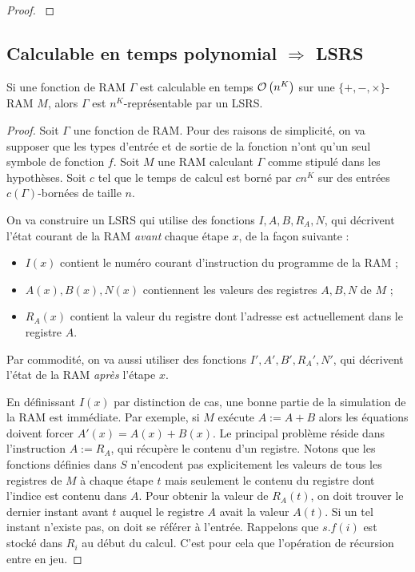 \begin{appendices}
\begin{proof}
{			}
			
		\end{proof}
		
		
		\subsection{Calculable en temps polynomial $\Rightarrow$ LSRS}
		\label{subsec:poly_implique_LSRS}
		
		\begin{conj}
			\label{conj:poly_implique_LSRS}
			Si une fonction de RAM $\Gamma$ est calculable en temps $\mathcal{O}\left( n^K  \right)$ sur une $\{+, -, \times \}$-RAM $M$, alors $\Gamma$ est $n^K$-représentable par un LSRS.
		\end{conj}
		
		\begin{proof}
			Soit $\Gamma$ une fonction de RAM. Pour des raisons de simplicité, on va supposer que les types d'entrée et de sortie de la fonction n'ont qu'un seul symbole de fonction $f$. Soit $M$ une RAM calculant $\Gamma$ comme stipulé dans les hypothèses. Soit $c$ tel que le temps de calcul est borné par $c n^K$ sur des entrées $c(\Gamma)$-bornées de taille $n$.
			
			On va construire un LSRS qui utilise des fonctions $I, A, B, R_A, N$, qui décrivent l'état courant de la RAM \emph{avant} chaque étape $x$, de la façon suivante :
			
			\begin{itemize}[itemsep=-1mm]
				\item	$I(x)$ contient le numéro courant d'instruction du programme de la RAM ;
				\item 	$A(x), B(x), N(x)$ contiennent les valeurs des registres $A, B, N$ de $M$ ;
				\item 	$R_A(x)$ contient la valeur du registre dont l'adresse est actuellement dans le registre $A$.
			\end{itemize}
			
			Par commodité, on va aussi utiliser des fonctions $I', A', B', R_A', N'$, qui décrivent l'état de la RAM \emph{après} l'étape $x$. 
			
			En définissant $I(x)$ par distinction de cas, une bonne partie de la simulation de la RAM est immédiate. Par exemple, si $M$ exécute $A:= A + B$ alors les équations doivent forcer $A'(x) = A(x) + B(x)$. Le principal problème réside dans l'instruction $A:= R_A$, qui récupère le contenu d'un registre. Notons que les fonctions définies dans $S$ n'encodent pas explicitement les valeurs de tous les registres de $M$ à chaque étape $t$ mais seulement le contenu du registre dont l'indice est contenu dans $A$. Pour obtenir la valeur de $R_A(t)$, on doit trouver le dernier instant avant $t$ auquel le registre $A$ avait la valeur $A(t)$. Si un tel instant n'existe pas, on doit se référer à l'entrée. Rappelons que $s.f(i)$ est stocké dans $R_i$ au début du calcul. C'est pour cela que l'opération de récursion entre en jeu\footnotemark.
			

\end{proof}
\end{appendices}

